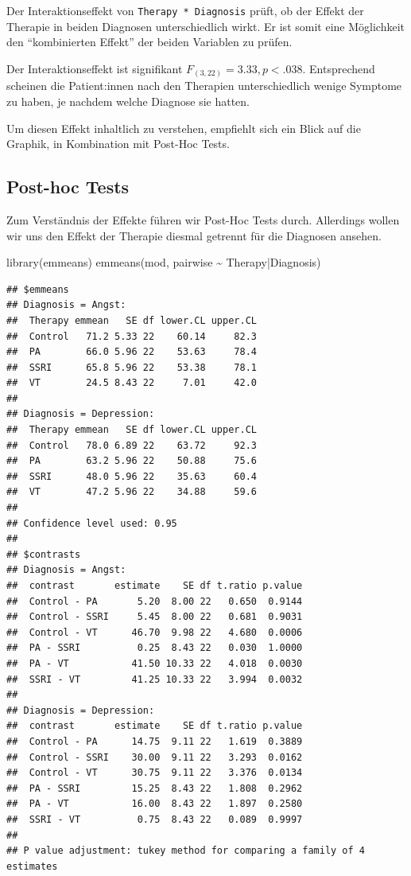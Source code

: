 \documentclass[
]{book}
\newenvironment{Shaded}{\begin{snugshade}}{\end{snugshade}}
\newcommand{\FunctionTok}[1]{\textcolor[rgb]{0.00,0.00,0.00}{#1}}
\newcommand{\NormalTok}[1]{#1}
\newcommand{\SpecialCharTok}[1]{\textcolor[rgb]{0.00,0.00,0.00}{#1}}
\begin{document}
Der Interaktionseffekt von \texttt{Therapy\ *\ Diagnosis} prüft, ob der Effekt der Therapie in beiden Diagnosen unterschiedlich wirkt.
Er ist somit eine Möglichkeit den ``kombinierten Effekt'' der beiden Variablen zu prüfen.

Der Interaktionseffekt ist signifikant \(F_{(3,22)}=3.33, p<.038\). Entsprechend scheinen die Patient:innen nach den Therapien unterschiedlich wenige Symptome zu haben, je nachdem welche Diagnose sie hatten.

Um diesen Effekt inhaltlich zu verstehen, empfiehlt sich ein Blick auf die Graphik, in Kombination mit Post-Hoc Tests.

\hypertarget{post-hoc-tests-1}{%
\subsection{Post-hoc Tests}\label{post-hoc-tests-1}}

Zum Verständnis der Effekte führen wir Post-Hoc Tests durch. Allerdings wollen wir uns den Effekt der Therapie diesmal getrennt für die Diagnosen ansehen.

\begin{Shaded}
\begin{Highlighting}[]
\FunctionTok{library}\NormalTok{(emmeans)}
\FunctionTok{emmeans}\NormalTok{(mod, pairwise }\SpecialCharTok{\textasciitilde{}}\NormalTok{ Therapy}\SpecialCharTok{|}\NormalTok{Diagnosis)}
\end{Highlighting}
\end{Shaded}

\begin{verbatim}
## $emmeans
## Diagnosis = Angst:
##  Therapy emmean   SE df lower.CL upper.CL
##  Control   71.2 5.33 22    60.14     82.3
##  PA        66.0 5.96 22    53.63     78.4
##  SSRI      65.8 5.96 22    53.38     78.1
##  VT        24.5 8.43 22     7.01     42.0
## 
## Diagnosis = Depression:
##  Therapy emmean   SE df lower.CL upper.CL
##  Control   78.0 6.89 22    63.72     92.3
##  PA        63.2 5.96 22    50.88     75.6
##  SSRI      48.0 5.96 22    35.63     60.4
##  VT        47.2 5.96 22    34.88     59.6
## 
## Confidence level used: 0.95 
## 
## $contrasts
## Diagnosis = Angst:
##  contrast       estimate    SE df t.ratio p.value
##  Control - PA       5.20  8.00 22   0.650  0.9144
##  Control - SSRI     5.45  8.00 22   0.681  0.9031
##  Control - VT      46.70  9.98 22   4.680  0.0006
##  PA - SSRI          0.25  8.43 22   0.030  1.0000
##  PA - VT           41.50 10.33 22   4.018  0.0030
##  SSRI - VT         41.25 10.33 22   3.994  0.0032
## 
## Diagnosis = Depression:
##  contrast       estimate    SE df t.ratio p.value
##  Control - PA      14.75  9.11 22   1.619  0.3889
##  Control - SSRI    30.00  9.11 22   3.293  0.0162
##  Control - VT      30.75  9.11 22   3.376  0.0134
##  PA - SSRI         15.25  8.43 22   1.808  0.2962
##  PA - VT           16.00  8.43 22   1.897  0.2580
##  SSRI - VT          0.75  8.43 22   0.089  0.9997
## 
## P value adjustment: tukey method for comparing a family of 4 estimates
\end{verbatim}
\end{document}
